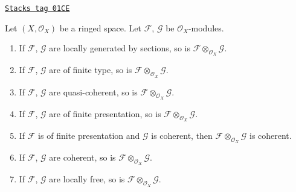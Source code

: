 \begin{lemma}
\label{modules-lemma-tensor-product-permanence}
\href{https://stacks.math.columbia.edu/tag/01CE}{\texttt{Stacks tag 01CE}}

Let $(X, \mathcal{O}_X)$ be a ringed space.
Let $\mathcal{F}$, $\mathcal{G}$ be $\mathcal{O}_X$-modules.
\begin{enumerate}
\item If $\mathcal{F}$, $\mathcal{G}$ are locally generated
by sections, so is $\mathcal{F} \otimes_{\mathcal{O}_X} \mathcal{G}$.
\item If $\mathcal{F}$, $\mathcal{G}$ are of finite type,
so is $\mathcal{F} \otimes_{\mathcal{O}_X} \mathcal{G}$.
\item If $\mathcal{F}$, $\mathcal{G}$ are quasi-coherent,
so is $\mathcal{F} \otimes_{\mathcal{O}_X} \mathcal{G}$.
\item If $\mathcal{F}$, $\mathcal{G}$ are of finite presentation,
so is $\mathcal{F} \otimes_{\mathcal{O}_X} \mathcal{G}$.
\item If $\mathcal{F}$ is of finite presentation and $\mathcal{G}$ is coherent,
then $\mathcal{F} \otimes_{\mathcal{O}_X} \mathcal{G}$ is coherent.
\item If $\mathcal{F}$, $\mathcal{G}$ are coherent,
so is $\mathcal{F} \otimes_{\mathcal{O}_X} \mathcal{G}$.
\item If $\mathcal{F}$, $\mathcal{G}$ are locally free,
so is $\mathcal{F} \otimes_{\mathcal{O}_X} \mathcal{G}$.
\end{enumerate}
\end{lemma}

